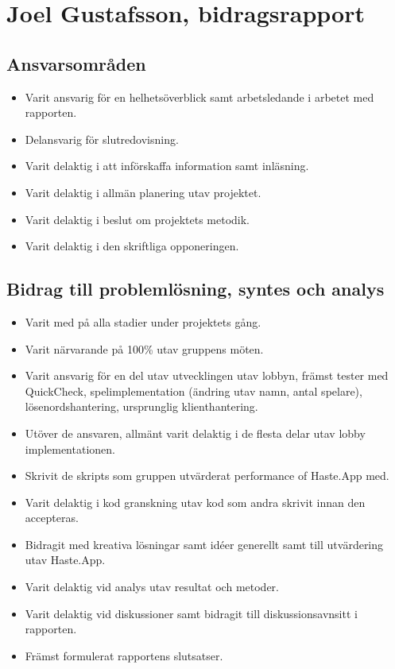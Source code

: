 
\section{Joel Gustafsson, bidragsrapport}
\subsection{Ansvarsområden}
\begin{itemize}
  \item Varit ansvarig för en helhetsöverblick samt arbetsledande i arbetet med rapporten.
  \item Delansvarig för slutredovisning.
  \item Varit delaktig i att införskaffa information samt inläsning.
  \item Varit delaktig i allmän planering utav projektet.
  \item Varit delaktig i beslut om projektets metodik.
  \item Varit delaktig i den skriftliga opponeringen.
\end{itemize}

\subsection{Bidrag till problemlösning, syntes och analys}
\begin{itemize}
  \item Varit med på alla stadier under projektets gång.
  \item Varit närvarande på 100\% utav gruppens möten.

  \item Varit ansvarig för en del utav utvecklingen utav lobbyn, främst tester med QuickCheck, spelimplementation (ändring utav namn, antal spelare), lösenordshantering, ursprunglig klienthantering.
  \item Utöver de ansvaren, allmänt varit delaktig i de flesta delar utav lobby implementationen.

  \item Skrivit de skripts som gruppen utvärderat performance of Haste.App med.
  \item Varit delaktig i kod granskning utav kod som andra skrivit innan den accepteras.

  \item Bidragit med kreativa lösningar samt idéer generellt samt till utvärdering utav Haste.App.
  \item Varit delaktig vid analys utav resultat och metoder.
  \item Varit delaktig vid diskussioner samt bidragit till diskussionsavnsitt i rapporten.
  \item Främst formulerat rapportens slutsatser.
\end{itemize}


